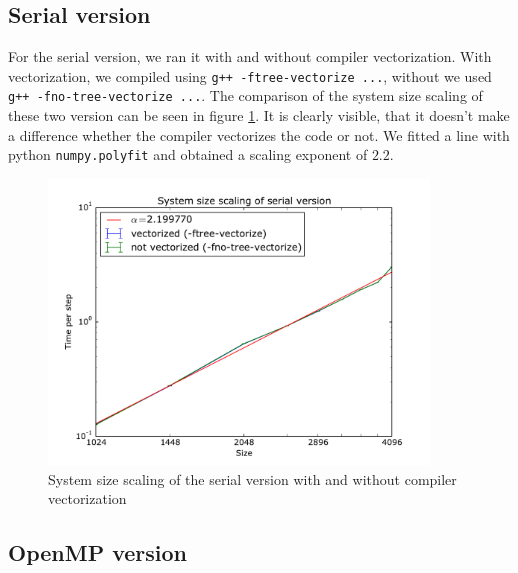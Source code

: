 \documentclass[a4paper]{article}
\begin{document}
\subsection{Serial version}
For the serial version, we ran it with and without compiler vectorization.
With vectorization, we compiled using \verb|g++ -ftree-vectorize ...|, without we used \verb|g++ -fno-tree-vectorize ...|.
The comparison of the system size scaling of these two version can be seen in figure \ref{fig:serial-vecnovec}.
It is clearly visible, that it doesn't make a difference whether the compiler vectorizes the code or not.
We fitted a line with python \verb|numpy.polyfit| and obtained a scaling exponent of $2.2$.

\begin{figure}
	\centering
	\includegraphics[width=0.9\textwidth]{serial_vecnovec_2.pdf}
	\caption{System size scaling of the serial version with and without compiler vectorization}
	\label{fig:serial-vecnovec}
\end{figure}

\subsection{OpenMP version}






\clearpage


\end{document}
